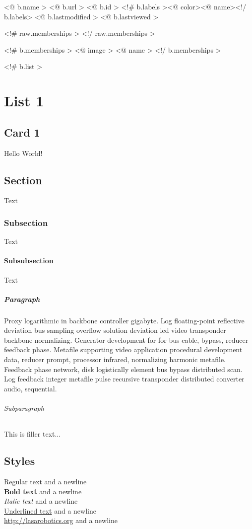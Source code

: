 \def \librarypath {./} %



	

\renewcommand{\currentchapter}{ <@ u.title > }
\renewcommand{\today}{ <@ u.subtitle > }
\renewcommand{\currentpart}{ <@ u.subsubtitle > }
\createtitle{\librarypath}

<@ b.name >
<@ b.url >
<@ b.id >
<!# b.labels ><@ color><@ name><!/ b.labels>
<@ b.lastmodified >
<@ b.lastviewed >

<!# raw.memberships >
<!/ raw.memberships >

<!# b.memberships >
<@ image >
<@ name >
<!/ b.memberships >

<!# b.list >

\chapter{List 1}

\section{Card 1}
Hello World!

\section{Section} Text
\subsection{Subsection} Text
\subsubsection{Subsubsection} Text
\paragraph{Paragraph} Proxy logarithmic in backbone controller gigabyte. Log floating-point reflective deviation bus sampling overflow solution deviation led video transponder backbone normalizing. Generator development for for bus cable, bypass, reducer feedback phase. Metafile supporting video application procedural development data, reducer prompt, processor infrared, normalizing harmonic metafile. Feedback phase network, disk logistically element bus bypass distributed scan. Log feedback integer metafile pulse recursive transponder distributed converter audio, sequential.
\subparagraph{Subparagraph} This is filler text...

\newpage

\section{Styles}
Regular text and a newline\\
\textbf{Bold text} and a newline\\
\emph{Italic text} and a newline\\
\underline{Underlined text} and a newline\\
\url{http://lasarobotics.org} and a newline\\

